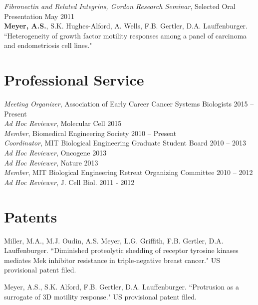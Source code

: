 \documentclass[11pt]{res}
\begin{document}
\begin{resume}
\clearpage

{\sl Fibronectin and Related Integrins, Gordon Research Seminar}, Selected Oral Presentation \hfill May 2011 \\
{\bf Meyer, A.S.}, S.K. Hughes-Alford, A. Wells, F.B. Gertler, D.A. Lauffenburger. ``Heterogeneity of growth factor motility responses among a panel of carcinoma and endometriosis cell lines."

\section{Professional Service}

{\sl Meeting Organizer}, Association of Early Career Cancer Systems Biologists \hfill 2015 -- Present \\
{\sl Ad Hoc Reviewer}, Molecular Cell \hfill 2015 \\
{\sl Member}, Biomedical Engineering Society \hfill 2010 -- Present \\
{\sl Coordinator}, MIT Biological Engineering Graduate Student Board \hfill 2010 -- 2013 \\
{\sl Ad Hoc Reviewer}, Oncogene \hfill 2013 \\
{\sl Ad Hoc Reviewer}, Nature \hfill 2013 \\
{\sl Member}, MIT Biological Engineering Retreat Organizing Committee \hfill 2010 -- 2012 \\
{\sl Ad Hoc Reviewer}, J. Cell Biol. \hfill 2011 - 2012 \\

\section{Patents}

Miller, M.A., M.J. Oudin, A.S. Meyer, L.G. Griffith, F.B. Gertler, D.A. Lauffenburger. ``Diminished proteolytic shedding of receptor tyrosine kinases mediates Mek inhibitor resistance in triple-negative breast cancer." US provisional patent filed.

Meyer, A.S., S.K. Alford, F.B. Gertler, D.A. Lauffenburger. ``Protrusion as a surrogate of 3D motility response." US provisional patent filed.

\end{resume} 
\end{document}

